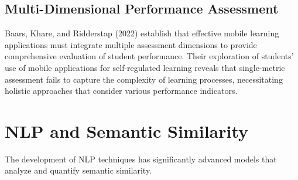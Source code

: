 \subsection{Multi-Dimensional Performance Assessment}

Baars, Khare, and Ridderstap (2022) establish that effective mobile learning applications must integrate multiple assessment dimensions to provide comprehensive evaluation of student performance. Their exploration of students' use of mobile applications for self-regulated learning reveals that single-metric assessment fails to capture the complexity of learning processes, necessitating holistic approaches that consider various performance indicators.


\section{NLP and Semantic Similarity}

The development of NLP techniques has significantly advanced models that analyze and quantify semantic similarity.

